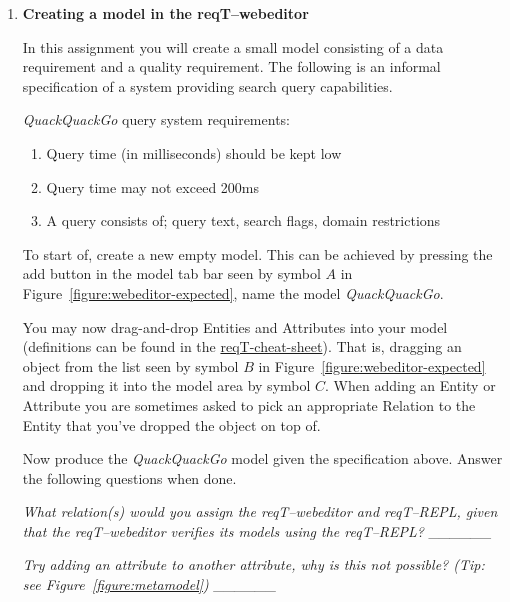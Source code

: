 \documentclass[11pt]{article}
\begin{document}
\begin{enumerate}
%
%
\item \textbf{Creating a model in the reqT--webeditor}

In this assignment you will create a small model consisting of a data requirement and a quality requirement.
The following is an informal specification of a system providing search query capabilities.

\begin{framed}
\textit{QuackQuackGo} query system requirements:
\begin{enumerate}
\item Query time (in milliseconds) should be kept low
\item Query time may not exceed 200ms
\item A query consists of;
\subitem query text,
\subitem search flags,
\subitem domain restrictions
\end{enumerate}
\end{framed}

To start of, create a new empty model. This can be achieved by pressing the add button in the model tab bar seen by symbol $A$ in Figure~\ref{figure:webeditor-expected}, name the model \textit{QuackQuackGo}.

You may now drag-and-drop Entities and Attributes into your model (definitions can be found in the \href{http://reqt.org/reqT-cheat-sheet.pdf}{reqT-cheat-sheet}). That is, dragging an object from the list seen by symbol $B$ in Figure~\ref{figure:webeditor-expected} and dropping it into the model area by symbol $C$. When adding an Entity or Attribute you are sometimes asked to pick an appropriate Relation to the Entity that you've dropped the object on top of.

Now produce the \textit{QuackQuackGo} model given the specification above. Answer the following questions when done.

\textit{What relation(s) would you assign the reqT--webeditor and reqT--REPL, given that the reqT--webeditor verifies its models using the reqT--REPL? \_\_\_\_\_\_} 


\textit{Try adding an attribute to another attribute, why is this not possible? (Tip: see Figure~\ref{figure:metamodel}) \_\_\_\_\_\_}



\end{enumerate}
\end{document}

